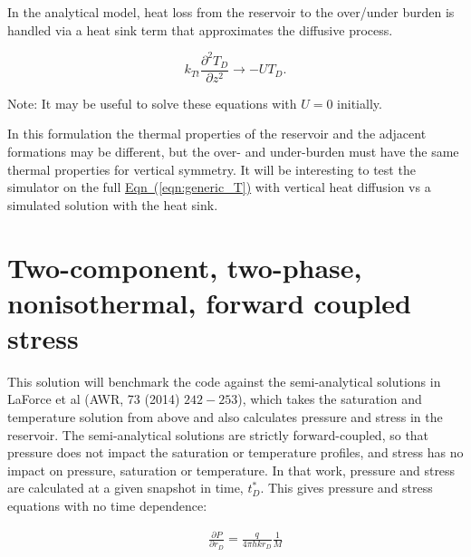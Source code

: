 \documentclass[12pt]{report}
\begin{document}
In the analytical model, heat loss from the reservoir to the over/under burden is handled via a heat sink term that approximates the diffusive process.

\begin{equation}
k_{Tt}\frac{\partial^2 T_D}{\partial z^2} \to -U T_D.
\end{equation}

\noindent Note: It may be useful to solve these equations with $U=0$ initially.



%

In this formulation the thermal properties of the reservoir and the
adjacent formations may be different, but the over- and under-burden
must have the same thermal properties for vertical symmetry.  It will
be interesting to test the simulator on the full
\hyperref[eqn:generic_T]{Eqn~(\ref*{eqn:generic_T})} with vertical
heat diffusion vs a simulated solution with the heat sink.


\section{Two-component, two-phase, nonisothermal, forward coupled stress}

This solution will benchmark the code against the semi-analytical solutions in LaForce et al (AWR, 73 (2014) $242 - 253$), which takes the saturation and temperature solution from above and also calculates pressure and stress in the reservoir.  The semi-analytical solutions are strictly forward-coupled, so that pressure does not impact the saturation or temperature profiles, and stress has no impact on pressure, saturation or temperature. In that work, pressure and stress are calculated at a given snapshot in time, $t_D^*$. This gives pressure and stress equations with no time dependence:

\begin{eqnarray}
&&\frac{\partial P}{\partial r_D} = \frac{q}{4\pi h k r_D}
  \frac{1}{M}\label{eqn:P_again}
\end{eqnarray}
\end{document}
